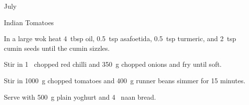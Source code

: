 \begin{menu}{July}
\begin{recipe}{2}{Indian Tomatoes}
\begin{ingredients}
		\end{ingredients}
	
	
    \begin{instructions}
    \item 
        In a large wok heat
        4~tbsp  oil,
        0.5~tsp  asafoetida,
        0.5~tsp  turmeric,
        and
        2~tsp  cumin seeds
        until
        the cumin sizzles.
      \item 
        Stir in
        1~ chopped red chilli
        and
        350~g chopped onions
        and
        fry until soft.
      \item 
        Stir in
        1000~g chopped tomatoes
        and
        400~g  runner beans
        simmer for 15 minutes.
      \item 
        Serve with
        500~g  plain yoghurt
        and
        4~  naan bread.
      
    \end{instructions}
    \end{recipe}%
  
    \clearpage
    \end{menu}
	
